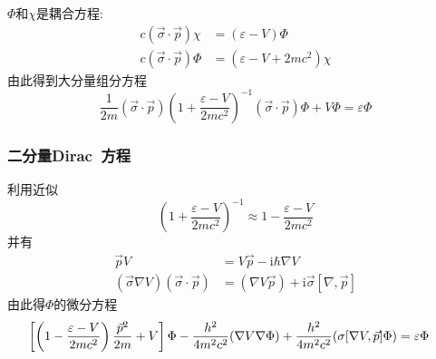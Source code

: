 {{	$\Phi$和$\chi$是耦合方程:%
	\begin{displaymath}
		\begin{aligned}
			c(\vec{\sigma}\cdot\vec p)\chi&=(\varepsilon-V)\Phi\\
			c(\vec{\sigma}\cdot\vec p)\Phi&=(\varepsilon-V+2mc^2)\chi
		\end{aligned}
	\end{displaymath}
	由此得到大分量组分方程
	\begin{displaymath}
		\frac1{2m}(\vec{\sigma}\cdot\vec p)\left( 1+\frac{\varepsilon-V}{2mc^2} \right)^{-1}(\vec{\sigma}\cdot\vec p)\Phi+V\Phi=\varepsilon\Phi	
	\end{displaymath}
}

\frame
{
	\frametitle{二分量\textrm{Dirac~}方程}
	利用近似$$\left( 1+\frac{\varepsilon-V}{2mc^2} \right)^{-1}\approx1-\frac{\varepsilon-V}{2mc^2}$$
	并有
	\begin{displaymath}
		\begin{aligned}
			\vec pV&=V\vec p-\mathrm{i}\hbar\nabla V\\
			(\vec{\sigma}\nabla V)(\vec{\sigma}\cdot\vec p)&=(\nabla V\vec p)+\mathrm{i}\vec{\sigma}[\nabla,\vec p]
		\end{aligned}
	\end{displaymath}
	由此得$\Phi$的微分方程
	\begin{displaymath}
		\hspace*{-10pt}	\left[ \left( 1-\frac{\varepsilon-V}{2mc^2} \right)\frac{\vec p^2}{2m}+V \right]\Phi-\frac{h^2}{4m^2c^2}(\nabla V\nabla \Phi)+\frac{h^2}{4m^2c^2}(\sigma[\nabla V,\vec p]\Phi)=\varepsilon\Phi
	\end{displaymath}
}

}
